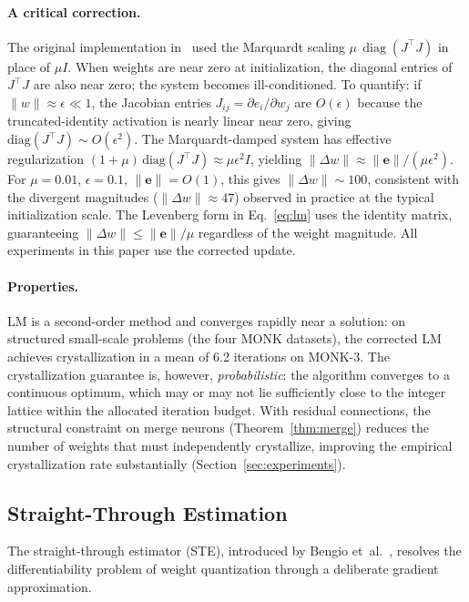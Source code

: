 \documentclass[lettersize,journal]{IEEEtran}
\begin{document}
\paragraph{A critical correction.}
The original implementation in~\cite{leandro2009} used the Marquardt scaling
$\mu\,\operatorname{diag}(J^\top J)$ in place of $\mu I$.
When weights are near zero at initialization, the diagonal entries of
$J^\top J$ are also near zero; the system becomes ill-conditioned.
To quantify: if $\|w\| \approx \epsilon \ll 1$, the Jacobian entries
$J_{ij} = \partial e_i/\partial w_j$ are $O(\epsilon)$ because the
truncated-identity activation is nearly linear near zero, giving
$\mathrm{diag}(J^\top J) \sim O(\epsilon^2)$.
The Marquardt-damped system has effective regularization
$(1+\mu)\,\mathrm{diag}(J^\top J) \approx \mu\epsilon^2 I$, yielding
$\|\Delta w\| \approx \|\mathbf{e}\|/(\mu\epsilon^2)$.
For $\mu = 0.01$, $\epsilon = 0.1$, $\|\mathbf{e}\| = O(1)$, this gives
$\|\Delta w\| \sim 100$, consistent with the divergent magnitudes
($\|\Delta w\| \approx 47$) observed in practice at the typical
initialization scale.
The Levenberg form in Eq.~\eqref{eq:lm} uses the identity matrix, guaranteeing
$\|\Delta w\| \leq \|\mathbf{e}\|/\mu$ regardless of the weight magnitude.
All experiments in this paper use the corrected update.

\paragraph{Properties.}
LM is a second-order method and converges rapidly near a solution:
on structured small-scale problems (the four MONK datasets), the corrected
LM achieves crystallization in a mean of 6.2 iterations on MONK-3.
The crystallization guarantee is, however, \emph{probabilistic}: the
algorithm converges to a continuous optimum, which may or may not lie
sufficiently close to the integer lattice within the allocated iteration
budget.
With residual connections, the structural constraint on merge neurons
(Theorem~\ref{thm:merge}) reduces the number of weights that must
independently crystallize, improving the empirical crystallization rate
substantially (Section~\ref{sec:experiments}).

\subsection{Straight-Through Estimation}
\label{ssec:ste}

The straight-through estimator (STE), introduced by Bengio
et~al.~\cite{bengio2013}, resolves the differentiability problem of
weight quantization through a deliberate gradient approximation.
\end{document}
